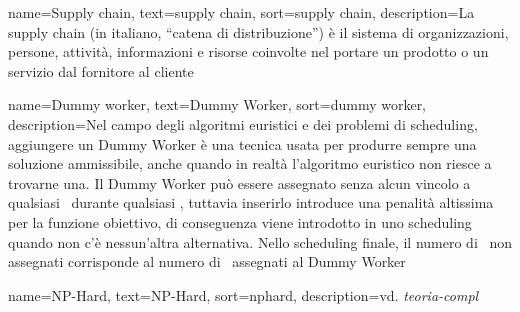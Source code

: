 {
    name=Supply chain,
    text=supply chain,
    sort=supply chain,
    description={La supply chain (in italiano, ``catena di distribuzione'') è il sistema di organizzazioni, persone, attività, informazioni e risorse coinvolte nel portare un prodotto o un servizio dal fornitore al cliente}
}

{
    name=Dummy worker,
    text=Dummy Worker,
    sort=dummy worker,
    description={Nel campo degli algoritmi euristici e dei problemi di scheduling, aggiungere un Dummy Worker è una tecnica usata per produrre sempre una soluzione ammissibile, anche quando in realtà l'algoritmo euristico non riesce a trovarne una. Il Dummy Worker può essere assegnato senza alcun vincolo a qualsiasi \task\ durante qualsiasi \ttb, tuttavia inserirlo introduce una penalità altissima per la funzione obiettivo, di conseguenza viene introdotto in uno scheduling quando non c'è nessun'altra alternativa. Nello scheduling finale, il numero di \task\ non assegnati corrisponde al numero di \task\ assegnati al Dummy Worker\\}
}


{
    name=NP-Hard,
    text=NP-Hard,
    sort=nphard,
    description={vd. \emph{\gls{teoria-compl}}\glsfirstoccur}
}

